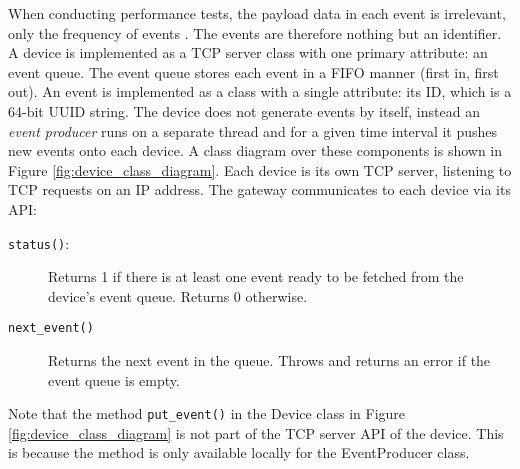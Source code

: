 When conducting performance tests, the payload data in each event is
irrelevant, only the frequency of events \cite{weyuker2000experience}. The
events are therefore nothing but an identifier. A device is implemented as a
TCP server class with one primary attribute: an event queue. The event queue
stores each event in a FIFO manner (first in, first out). An event is
implemented as a class with a single attribute: its ID, which is a 64-bit UUID
string. The device does not generate events by itself, instead an \textit{event
producer} runs on a separate thread and for a given time interval it pushes new
events onto each device. A class diagram over these components is shown in
Figure \ref{fig:device_class_diagram}. Each device is its own TCP server,
listening to TCP requests on an IP address. The gateway communicates to each
device via its API:

\begin{description}

    \item[\texttt{status()}:] Returns 1 if there is at least one event ready to
        be fetched from the device's event queue. Returns 0 otherwise.

    \item[\texttt{next\_event()}] Returns the next event in the queue. Throws
        and returns an error if the event queue is empty.

\end{description}

Note that the method \texttt{put\_event()} in the Device class in Figure
\ref{fig:device_class_diagram} is not part of the TCP server API of the device.
This is because the method is only available locally for the EventProducer class.

